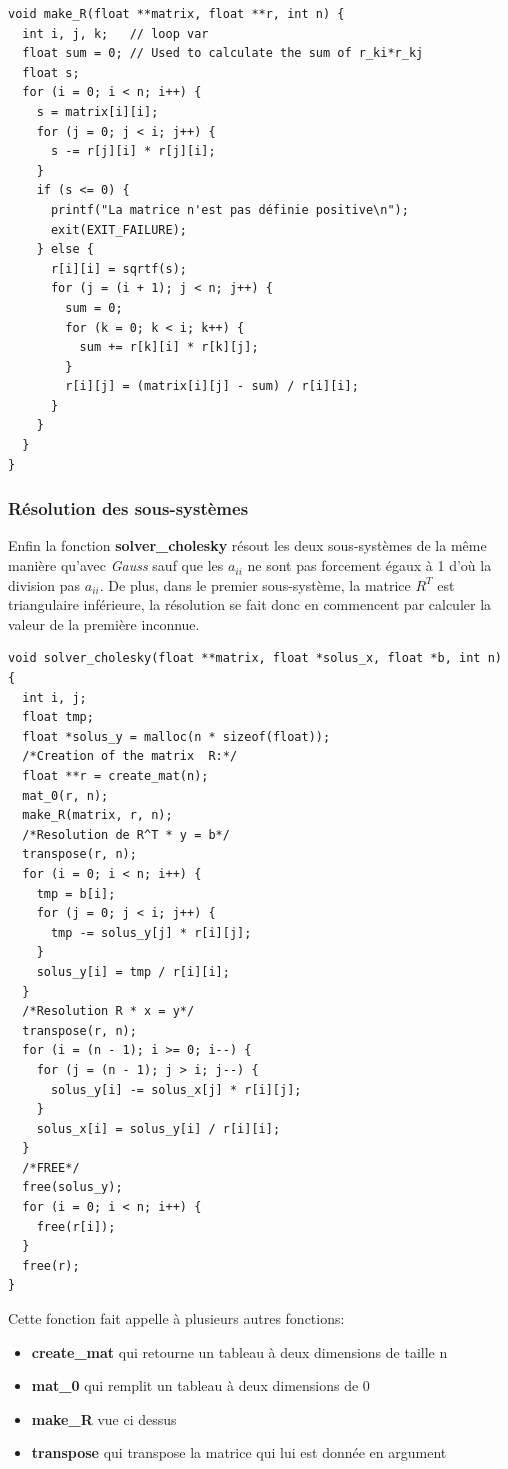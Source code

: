 \documentclass[a4paper]{article}
\begin{document}
\begin{lstlisting}
void make_R(float **matrix, float **r, int n) {
  int i, j, k;   // loop var
  float sum = 0; // Used to calculate the sum of r_ki*r_kj
  float s;
  for (i = 0; i < n; i++) {
    s = matrix[i][i];
    for (j = 0; j < i; j++) {
      s -= r[j][i] * r[j][i];
    }
    if (s <= 0) {
      printf("La matrice n'est pas définie positive\n");
      exit(EXIT_FAILURE);
    } else {
      r[i][i] = sqrtf(s);
      for (j = (i + 1); j < n; j++) {
        sum = 0;
        for (k = 0; k < i; k++) {
          sum += r[k][i] * r[k][j];
        }
        r[i][j] = (matrix[i][j] - sum) / r[i][i];
      }
    }
  }
}
\end{lstlisting}

\subsubsection{Résolution des sous-systèmes}

Enfin la fonction \textbf{solver\_cholesky} résout les deux sous-systèmes de la
même manière qu'avec \textit{Gauss} sauf que les $a_{ii}$ ne sont pas forcement
égaux à 1 d'où la division pas $a_{ii}$. De plus, dans le premier sous-système,
la matrice $R^{T}$ est triangulaire inférieure, la résolution se fait donc en
commencent par calculer la valeur de la première inconnue.

\begin{lstlisting}
void solver_cholesky(float **matrix, float *solus_x, float *b, int n) {
  int i, j;
  float tmp;
  float *solus_y = malloc(n * sizeof(float));
  /*Creation of the matrix  R:*/
  float **r = create_mat(n);
  mat_0(r, n);
  make_R(matrix, r, n);
  /*Resolution de R^T * y = b*/
  transpose(r, n);
  for (i = 0; i < n; i++) {
    tmp = b[i];
    for (j = 0; j < i; j++) {
      tmp -= solus_y[j] * r[i][j];
    }
    solus_y[i] = tmp / r[i][i];
  }
  /*Resolution R * x = y*/
  transpose(r, n);
  for (i = (n - 1); i >= 0; i--) {
    for (j = (n - 1); j > i; j--) {
      solus_y[i] -= solus_x[j] * r[i][j];
    }
    solus_x[i] = solus_y[i] / r[i][i];
  }
  /*FREE*/
  free(solus_y);
  for (i = 0; i < n; i++) {
    free(r[i]);
  }
  free(r);
}
\end{lstlisting}

Cette fonction fait appelle à plusieurs autres fonctions:

\begin{itemize}
\item \textbf{create\_mat} qui retourne un tableau à deux dimensions de taille n
\item \textbf{mat\_0} qui remplit un tableau à deux dimensions de 0
\item \textbf{make\_R} vue ci dessus
\item \textbf{transpose} qui transpose la matrice qui lui est donnée en argument
\end{itemize}
\end{document}
